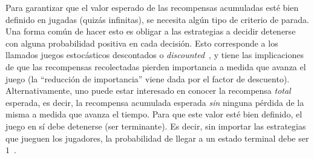 Para garantizar que el valor esperado de las recompensas acumuladas esté bien definido en jugadas (quizás infinitas), se necesita algún tipo de criterio de parada. Una forma común de hacer esto es obligar a las estrategias a decidir detenerse con alguna probabilidad positiva en cada decisión. Esto corresponde a los llamados juegos estocásticos descontados o \textit{discounted}~\cite{Shapley1095,FilarV96}, y tiene las implicaciones de que las recompensas recolectadas pierden importancia a medida que avanza el juego (la ``reducción de importancia'' viene dada por el factor de descuento). Alternativamente, uno puede estar interesado en conocer la recompensa \emph{total} esperada, es decir, la recompensa acumulada esperada \emph{sin} ninguna pérdida de la misma a medida que avanza el tiempo. Para que este valor esté bien definido, el juego en sí debe detenerse (ser terminante). Es decir, sin importar las estrategias que jueguen los jugadores, la probabilidad de llegar a un estado terminal debe ser $1$~\cite{Condon90,FilarV96}.
